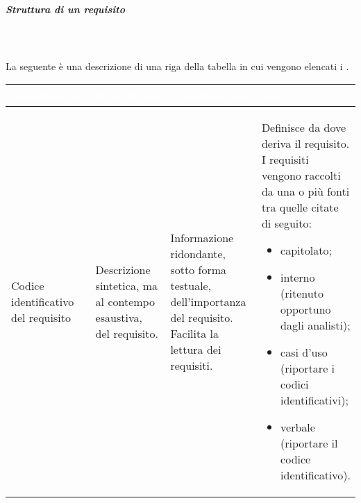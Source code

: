 \subparagraph*{Struttura di un requisito}\mbox{}\\ \\
La seguente è una descrizione di una riga della tabella in cui vengono elencati i .

{
\renewcommand{\arraystretch}{1.5}
\centering
\begin{longtable}{C{3cm} C{3.2cm} C{4.3cm} C{4.3cm}}
\textcolor{white}{\textbf{Identificativo}} & %
\textcolor{white}{\textbf{Descrizione}} & %
\textcolor{white}{\textbf{Classificazione}} & %
\textcolor{white}{\textbf{Fonti}} \\ %
\endhead
Codice identificativo del requisito & %
Descrizione sintetica, ma al contempo esaustiva, del requisito. & %
Informazione ridondante, sotto forma testuale, dell’importanza del requisito. Facilita la lettura dei requisiti. & %
Definisce da dove deriva il requisito. I requisiti vengono raccolti da una o più fonti tra quelle citate di seguito:
\begin{itemize}
	\item capitolato;
	\item interno (ritenuto opportuno dagli analisti);
	\item casi d'uso (riportare i codici identificativi);
	\item verbale (riportare il codice identificativo).
\end{itemize} \\
\end{longtable}
}